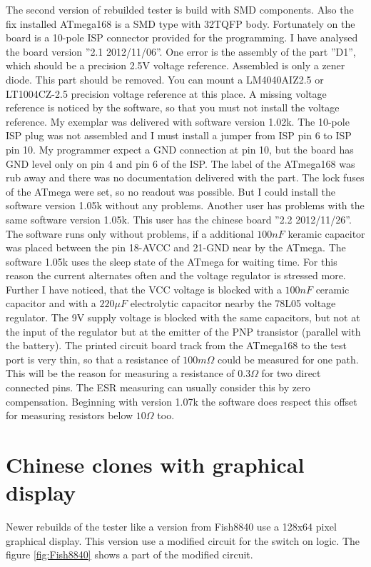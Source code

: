 The second version of rebuilded tester is build with SMD components. Also the fix installed ATmega168
is a SMD type with 32TQFP body.
Fortunately on the board is a 10-pole ISP connector provided for the programming.
I have analysed the board version ''2.1 2012/11/06''. One error is the assembly of the part ''D1'',
which should be a precision 2.5V voltage reference. Assembled is only a zener diode.
This part should be removed. You can mount a LM4040AIZ2.5 or LT1004CZ-2.5 precision voltage reference
at this place. A missing voltage reference is noticed by the software, so that you must not install
the voltage reference.
My exemplar was delivered with software version 1.02k. The 10-pole ISP plug was not assembled and I must
install a jumper from ISP pin 6 to ISP pin 10. My programmer expect a GND connection at pin 10, but the
board has GND level only on pin 4 and pin 6 of the ISP.
The label of the ATmega168 was rub away and there was no documentation delivered with the part.
The lock fuses of the ATmega were set, so no readout was possible.
But I could install the software version 1.05k without any problems.
Another user has problems with the same software version 1.05k. This user has the chinese board ''2.2 2012/11/26''.
The software runs only without problems, if a additional \(100nF\) keramic capacitor was placed between
the pin 18-AVCC and 21-GND near by the ATmega.
The software 1.05k uses the sleep state of the ATmega for waiting time. For this reason the current alternates
often and the voltage regulator is stressed more.
Further I have noticed, that the VCC voltage is blocked with a \(100nF\) ceramic capacitor and with a
\(220\mu F\) electrolytic capacitor nearby the 78L05 voltage regulator.
The 9V supply voltage is blocked with the same capacitors, but not at the input of the regulator but
at the emitter of the PNP transistor (parallel with the battery). 
The printed circuit board track from the ATmega168 to the test port is very thin, so that a resistance
of \(100m \Omega\) could be measured for one path. This will be the reason for measuring a resistance
of \(0.3 \Omega\) for two direct connected pins.
The ESR measuring can usually consider this by zero compensation.
Beginning with version 1.07k  the software does respect this offset for measuring resistors below \(10 \Omega\) too.

\section{Chinese clones with graphical display}
Newer rebuilds of the tester like a version from Fish8840  use a 128x64 pixel graphical display.
This version use a modified circuit for the switch on logic. 
The figure \ref{fig:Fish8840} shows a part of the modified circuit.

